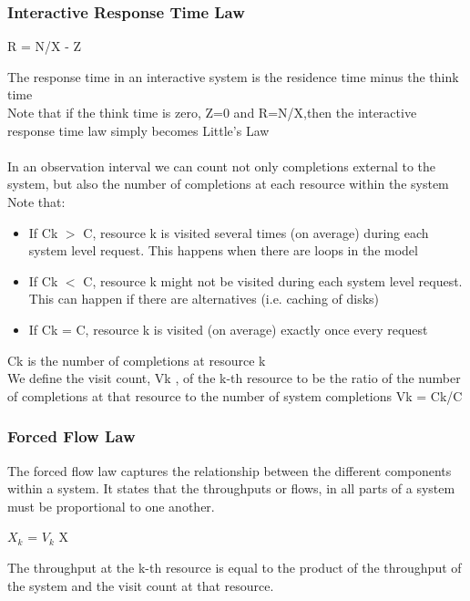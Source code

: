 \documentclass[10pt, oneside]{article}
\begin{document}
\subsubsection{Interactive Response Time Law}\begin{center}
    R = N/X - Z
\end{center}The response time in an interactive system is the residence time minus the think time\\ Note that if the think time is zero, Z=0 and R=N/X,then the interactive response time law simply becomes Little’s Law\\\\
In an observation interval we can count not only completions external to the system, but also the number of completions at each resource within the system\\
Note that:\begin{itemize}
    \item If Ck $>$ C, resource k is visited several times (on average) during each system level request. This happens when there are loops in the model
    \item If Ck $<$ C, resource k might not be visited during each system level request. This can happen if there are alternatives (i.e. caching of disks)
    \item If Ck = C, resource k is visited (on average) exactly once every request
\end{itemize}Ck is the number of completions at resource k\\We define the visit count, Vk , of the k-th resource to be the ratio of the number of completions at that resource to the number of system completions Vk = Ck/C
\subsubsection{Forced Flow Law}The forced flow law captures the relationship between the different components within a system. It states that the throughputs or flows, in all parts of a system must be proportional to one another.\begin{center}
    $X_k$ = $V_k$ X
\end{center}The throughput at the k-th resource is equal to the product of the throughput of the system and the visit count at that resource.
\end{document}
